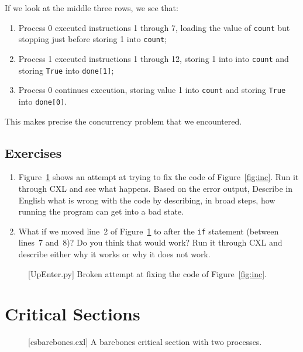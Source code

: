 \documentclass{report}
\newenvironment{code}{
\tcolorbox
}{
\endtcolorbox
}
\begin{document}
If we look at the middle three rows, we see that:
\begin{enumerate}
\item Process 0 executed instructions 1 through 7, loading the value of
\texttt{count} but stopping just before storing 1 into \texttt{count};
\item Process 1 executed instructions 1 through 12, storing 1 into
into \texttt{count} and storing \texttt{True} into \texttt{done[1]};
\item Process 0 continues execution, storing value 1 into \texttt{count}
and storing \texttt{True} into \texttt{done[0]}.
\end{enumerate}

This makes precise the concurrency problem that we encountered.

\section*{Exercises}

\begin{enumerate}
\item Figure~\ref{fig:incenter} shows an attempt at trying to fix the code of
    Figure~\ref{fig:inc}.  Run it through CXL and see what happens.  Based on
    the error output, Describe in English what is wrong with the code by describing,
    in broad steps, how running the program can get into a bad state.
\item What if we moved line~2 of Figure~\ref{fig:incenter} to after the \texttt{if}
    statement (between lines~7 and~8)?  Do you think that would work?  Run it through
    CXL and describe either why it works or why it does not work.
\end{enumerate}

\begin{figure}
\begin{code}
\end{code}
\caption{[UpEnter.py] Broken attempt at fixing the code of Figure~\ref{fig:inc}.}
\label{fig:incenter}
\end{figure}

\chapter{Critical Sections}
\label{ch:critical}

\begin{figure}
\begin{code}
\end{code}
\caption{[csbarebones.cxl] A barebones critical section with two processes.}
\label{fig:csbarebones}
\end{figure}
\end{document}

